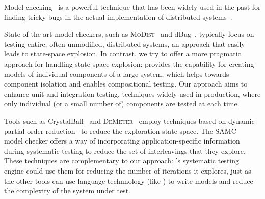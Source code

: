 Model checking~\cite{godefroid1997verisoft} is a powerful technique that has been widely used in the past for finding tricky bugs in the actual implementation of distributed systems~\cite{killian2007life, yang2009modist, yabandeh2009crystalball, guerraoui2011model, guo2011practical, simsa2011dbug, leesatapornwongsa2014samc}. 

State-of-the-art model checkers, such as \textsc{MoDist}~\cite{yang2009modist} and dBug~\cite{simsa2011dbug}, typically focus on testing entire, often unmodified, distributed systems, an approach that easily leads to state-space explosion. In contrast, we try to offer a more pragmatic approach for handling state-space explosion: \psharp provides the capability for creating models of individual components of a large system, which helps towards component isolation and enables compositional testing. Our approach aims to enhance unit and integration testing, techniques widely used in production, where only individual (or a small number of) components are tested at each time.

Tools such as CrystalBall~\cite{yabandeh2009crystalball} and \textsc{DeMeter}~\cite{guo2011practical} employ techniques based on dynamic partial order reduction~\cite{lauterburg2010evaluating} to reduce the exploration state-space. The SAMC~\cite{leesatapornwongsa2014samc} model checker offers a way of incorporating application-specific information during systematic testing to reduce the set of interleavings that they explore. These techniques are complementary to our approach: \psharp's systematic testing engine could use them for reducing the number of iterations it explores, just as the other tools can use language technnology (like \psharp) to write models and reduce the complexity of the system under test. 



